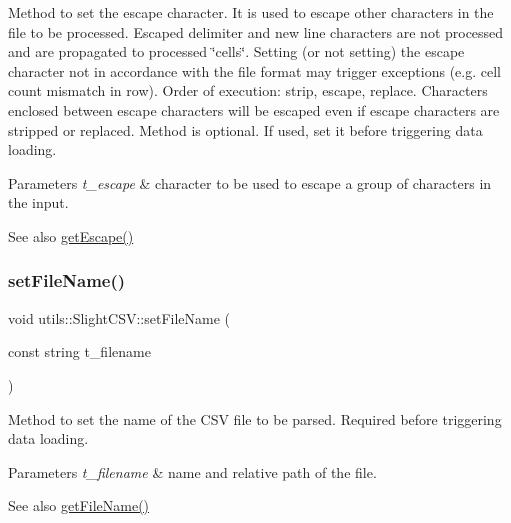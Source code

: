 Method to set the escape character. It is used to escape other characters in the file to be processed. Escaped delimiter and new line characters are not processed and are propagated to processed \char`\"{}cells\char`\"{}. Setting (or not setting) the escape character not in accordance with the file format may trigger exceptions (e.\+g. cell count mismatch in row). Order of execution\+: strip, escape, replace. Characters enclosed between escape characters will be escaped even if escape characters are stripped or replaced. Method is optional. If used, set it before triggering data loading. 
\begin{DoxyParams}{Parameters}
{\em t\+\_\+escape} & character to be used to escape a group of characters in the input. \\
\hline
\end{DoxyParams}
\begin{DoxySeeAlso}{See also}
\hyperlink{classutils_1_1SlightCSV_aca0cbc1e472dbe7b7a774d6add7c482f}{get\+Escape()} 
\end{DoxySeeAlso}
\mbox{\label{classutils_1_1SlightCSV_aba4b71a4a4bfa2317985a1a9cd53fc85}} 
\subsubsection{\texorpdfstring{set\+File\+Name()}{setFileName()}}
{\footnotesize\ttfamily void utils\+::\+Slight\+C\+S\+V\+::set\+File\+Name (\begin{DoxyParamCaption}\item[{const string}]{t\+\_\+filename }\end{DoxyParamCaption})}

Method to set the name of the C\+SV file to be parsed. Required before triggering data loading. 
\begin{DoxyParams}{Parameters}
{\em t\+\_\+filename} & name and relative path of the file. \\
\hline
\end{DoxyParams}
\begin{DoxySeeAlso}{See also}
\hyperlink{classutils_1_1SlightCSV_ad689937346e0d6dd37597e7c3458e164}{get\+File\+Name()} 
\end{DoxySeeAlso}
\mbox{\label{classutils_1_1SlightCSV_aae3c78a070879263d270a494e1dfcbca}} 
